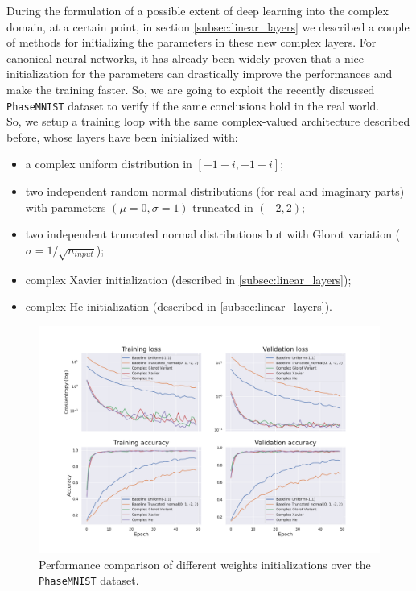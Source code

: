 \documentclass[../main.tex]{subfiles}
\begin{document}
During the formulation of a possible extent of deep learning into the complex domain, at a certain point, in section \ref{subsec:linear_layers} we described a couple of methods for initializing the parameters in these new complex layers. For canonical neural networks, it has already been widely proven that a nice initialization for the parameters can drastically improve the performances and make the training faster. So, we are going to exploit the recently discussed \texttt{PhaseMNIST} dataset to verify if the same conclusions hold in the real world.\\
So, we setup a training loop with the same complex-valued architecture described before, whose layers have been initialized with:
\begin{itemize}
	\item a complex uniform distribution in $[-1-i,+1+i]$;
	\item two independent random normal distributions (for real and imaginary parts) with parameters $(\mu=0, \sigma=1)$ truncated in $(-2,2)$;
	\item  two independent truncated normal distributions but with Glorot variation ($\sigma = 1/\sqrt{n_{input}}$);
	\item complex Xavier initialization (described in \ref{subsec:linear_layers});
	\item complex He initialization (described in \ref{subsec:linear_layers}).
\end{itemize}
\begin{figure}[!ht]
	\centering
	\includegraphics[width=\textwidth]{pictures/performance_winit}
	\caption{Performance comparison of different weights initializations over the \texttt{PhaseMNIST} dataset.}
	\label{fig:performance_winit}
\end{figure}
\end{document}
